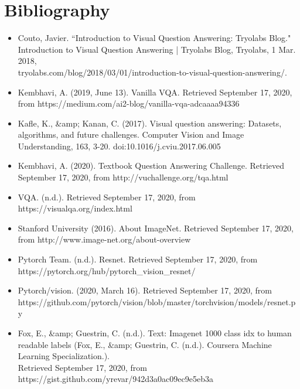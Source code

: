 \documentclass[manuscript,11pt]{article}
\begin{document}
\pagebreak
\section{Bibliography}
\begin{itemize}
\item Couto, Javier. ``Introduction to Visual Question Answering: Tryolabs Blog." Introduction to Visual Question Answering | Tryolabs Blog, Tryolabs, 1 Mar. 2018, \\
tryolabs.com/blog/2018/03/01/introduction-to-visual-question-answering/. 
\item Kembhavi, A. (2019, June 13). Vanilla VQA. Retrieved September 17, 2020, from 
https://medium.com/ai2-blog/vanilla-vqa-adcaaaa94336
\item Kafle, K., \&amp; Kanan, C. (2017). Visual question answering: Datasets, algorithms, and future challenges. Computer Vision and Image Understanding, 
163, 3-20. doi:10.1016/j.cviu.2017.06.005
\item Kembhavi, A. (2020). Textbook Question Answering Challenge. Retrieved September 17, 2020, from http://vuchallenge.org/tqa.html
\item VQA. (n.d.). Retrieved September 17, 2020, from https://visualqa.org/index.html
\item Stanford University (2016). About ImageNet. Retrieved September 17, 2020, from http://www.image-net.org/about-overview
\item Pytorch Team. (n.d.). Resnet. Retrieved September 17, 2020, from \\
https://pytorch.org/hub/pytorch\_vision\_resnet/
\item Pytorch/vision. (2020, March 16). Retrieved September 17, 2020, from \\
https://github.com/pytorch/vision/blob/master/torchvision/models/resnet.py
\item Fox, E., \&amp; Guestrin, C. (n.d.). Text: Imagenet 1000 class idx to human readable labels (Fox, E., &amp; Guestrin, C. (n.d.). Coursera Machine Learning Specialization.). \\
Retrieved September 17, 2020, from https://gist.github.com/yrevar/942d3a0ac09ec9e5eb3a
\end{itemize}
\end{document}
